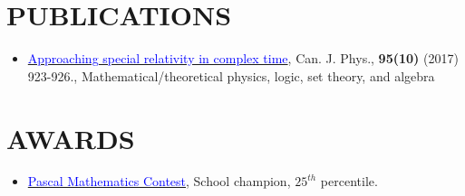 \documentclass[margin]{res}
\begin{document}
\begin{resume}
	\section{\textcolor{NavyBlue}{PUBLICATIONS}}
	\begin{itemize}
		\item \href{https://www.nrcresearchpress.com/doi/abs/10.1139/cjp-2017-0089?journalCode=cjp#.X3Z1_GhKiUk}{\textcolor{blue}{Approaching special relativity in complex time}}, Can. J. Phys., \textbf{95(10)} (2017) 923-926., Mathematical/theoretical physics, logic, set theory, and algebra
	\end{itemize}

	\section{\textcolor{NavyBlue}{AWARDS}}
	\begin{itemize}
		\item 	\href{https://www.cemc.uwaterloo.ca/contests/pcf.html}{\textcolor{blue}{Pascal Mathematics Contest}}, School champion, $25^{th}$ percentile.
	\end{itemize}
\end{resume}
\end{document}
